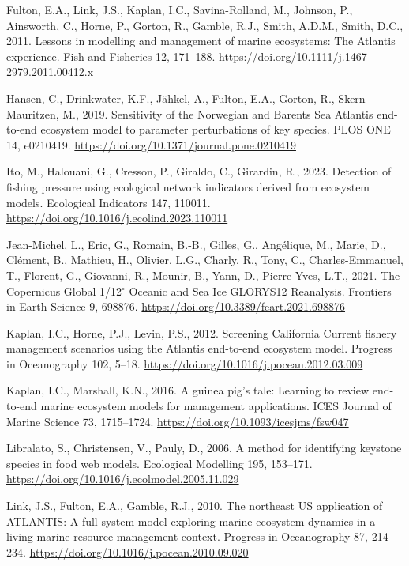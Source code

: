 \documentclass[
]{article}
\newlength{\cslhangindent}
\newenvironment{CSLReferences}[2] %
 {\begin{list}{}{%
  \setlength{\itemindent}{0pt}
  \setlength{\leftmargin}{0pt}
  \setlength{\parsep}{0pt}
  \ifodd #1
   \setlength{\leftmargin}{\cslhangindent}
   \setlength{\itemindent}{-1\cslhangindent}
  \fi
  \setlength{\itemsep}{#2\baselineskip}}}
 {\end{list}}
\begin{document}
\begin{CSLReferences}{1}{0}
Fulton, E.A., Link, J.S., Kaplan, I.C., Savina-Rolland, M., Johnson, P., Ainsworth, C., Horne, P., Gorton, R., Gamble, R.J., Smith, A.D.M., Smith, D.C., 2011. Lessons in modelling and management of marine ecosystems: The {Atlantis} experience. Fish and Fisheries 12, 171--188. \url{https://doi.org/10.1111/j.1467-2979.2011.00412.x}

Hansen, C., Drinkwater, K.F., Jähkel, A., Fulton, E.A., Gorton, R., Skern-Mauritzen, M., 2019. Sensitivity of the {Norwegian} and {Barents Sea Atlantis} end-to-end ecosystem model to parameter perturbations of key species. PLOS ONE 14, e0210419. \url{https://doi.org/10.1371/journal.pone.0210419}

Ito, M., Halouani, G., Cresson, P., Giraldo, C., Girardin, R., 2023. Detection of fishing pressure using ecological network indicators derived from ecosystem models. Ecological Indicators 147, 110011. \url{https://doi.org/10.1016/j.ecolind.2023.110011}

Jean-Michel, L., Eric, G., Romain, B.-B., Gilles, G., Angélique, M., Marie, D., Clément, B., Mathieu, H., Olivier, L.G., Charly, R., Tony, C., Charles-Emmanuel, T., Florent, G., Giovanni, R., Mounir, B., Yann, D., Pierre-Yves, L.T., 2021. The {Copernicus Global} 1/12{\(^\circ\)} {Oceanic} and {Sea Ice GLORYS12 Reanalysis}. Frontiers in Earth Science 9, 698876. \url{https://doi.org/10.3389/feart.2021.698876}

Kaplan, I.C., Horne, P.J., Levin, P.S., 2012. Screening {California Current} fishery management scenarios using the {Atlantis} end-to-end ecosystem model. Progress in Oceanography 102, 5--18. \url{https://doi.org/10.1016/j.pocean.2012.03.009}

Kaplan, I.C., Marshall, K.N., 2016. A guinea pig's tale: Learning to review end-to-end marine ecosystem models for management applications. ICES Journal of Marine Science 73, 1715--1724. \url{https://doi.org/10.1093/icesjms/fsw047}

Libralato, S., Christensen, V., Pauly, D., 2006. A method for identifying keystone species in food web models. Ecological Modelling 195, 153--171. \url{https://doi.org/10.1016/j.ecolmodel.2005.11.029}

Link, J.S., Fulton, E.A., Gamble, R.J., 2010. The northeast {US} application of {ATLANTIS}: {A} full system model exploring marine ecosystem dynamics in a living marine resource management context. Progress in Oceanography 87, 214--234. \url{https://doi.org/10.1016/j.pocean.2010.09.020}


\end{CSLReferences}
\end{document}
